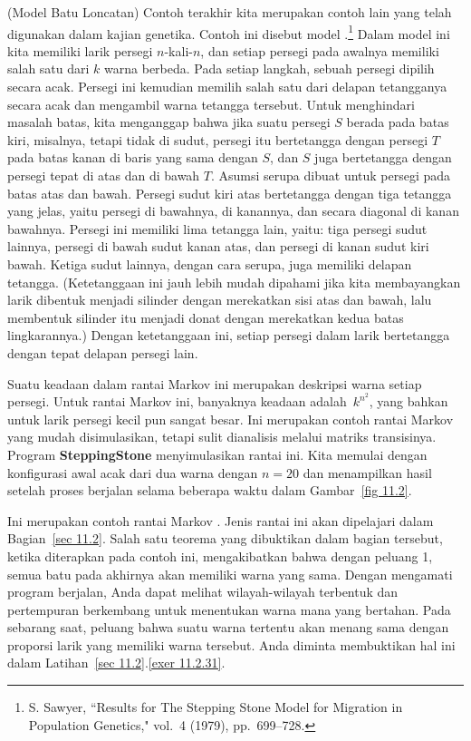 \begin{example} \label{exam 11.1.10}
(Model Batu Loncatan) Contoh terakhir kita merupakan contoh lain yang telah
digunakan dalam kajian genetika. Contoh ini disebut model .\footnote{S.
Sawyer, ``Results for The Stepping Stone Model for Migration in Population
Genetics,"  vol.~4 (1979),
pp.~699--728.} Dalam model ini kita memiliki larik persegi
$n$-kali-$n$, dan setiap persegi pada awalnya memiliki salah satu dari $k$
warna berbeda. Pada setiap langkah, sebuah persegi dipilih secara acak. Persegi
ini kemudian memilih salah satu dari delapan tetangganya secara acak dan
mengambil warna tetangga tersebut. Untuk menghindari masalah batas, kita
menganggap bahwa jika suatu persegi $S$ berada pada batas kiri, misalnya, tetapi
tidak di sudut, persegi itu bertetangga dengan persegi $T$ pada batas kanan di
baris yang sama dengan $S$, dan $S$ juga bertetangga dengan persegi tepat di
atas dan di bawah $T$. Asumsi serupa dibuat untuk persegi pada batas atas dan
bawah. Persegi sudut kiri atas bertetangga dengan tiga tetangga yang jelas,
yaitu persegi di bawahnya, di kanannya, dan secara diagonal di kanan bawahnya.
Persegi ini memiliki lima tetangga lain, yaitu: tiga persegi sudut lainnya,
persegi di bawah sudut kanan atas, dan persegi di kanan sudut kiri bawah.
Ketiga sudut lainnya, dengan cara serupa, juga memiliki delapan tetangga.
(Ketetanggaan ini jauh lebih mudah dipahami jika kita membayangkan larik
dibentuk menjadi silinder dengan merekatkan sisi atas dan bawah, lalu membentuk
silinder itu menjadi donat dengan merekatkan kedua batas lingkarannya.) Dengan
ketetanggaan ini, setiap persegi dalam larik bertetangga dengan tepat delapan
persegi lain.
\par
Suatu keadaan dalam rantai Markov ini merupakan deskripsi warna setiap persegi.
Untuk rantai Markov ini, banyaknya keadaan adalah~$k^{n^2}$, yang bahkan untuk
larik persegi kecil pun sangat besar. Ini merupakan contoh rantai Markov yang
mudah disimulasikan, tetapi sulit dianalisis melalui matriks transisinya. Program
{\bf SteppingStone} menyimulasikan rantai ini.
Kita memulai dengan konfigurasi awal acak dari dua warna dengan $n = 20$ dan
menampilkan hasil setelah proses berjalan selama beberapa waktu dalam
Gambar~\ref{fig 11.2}.
\noindent
\par
Ini merupakan contoh rantai Markov . Jenis rantai ini akan
dipelajari dalam Bagian~\ref{sec 11.2}. Salah satu teorema yang dibuktikan dalam
bagian tersebut, ketika diterapkan pada contoh ini, mengakibatkan bahwa dengan
peluang 1, semua batu pada akhirnya akan memiliki warna yang sama. Dengan
mengamati program berjalan, Anda dapat melihat wilayah-wilayah terbentuk dan
pertempuran berkembang untuk menentukan warna mana yang bertahan. Pada sebarang
saat, peluang bahwa suatu warna tertentu akan menang sama dengan proporsi larik
yang memiliki warna tersebut. Anda diminta membuktikan hal ini dalam
Latihan~\ref{sec 11.2}.\ref{exer 11.2.31}.
\end{example}

